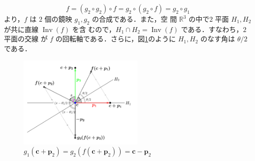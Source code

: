 \documentclass[11pt, uplatex, dvipdfmx, titlepage]{jsarticle}
\makeatletter
\DeclareMathOperator{\Inv}{Inv}
\renewenvironment{proof}[1][\proofname]{\par
  \pushQED{\qed}%
  \normalfont \topsep6\p@\@plus6\p@\relax
  \trivlist
  \item[\hskip\labelsep
         \bfseries
    {#1}]\ignorespaces
}{%
  \popQED\endtrivlist\@endpefalse
}
\theoremstyle{definition}
\renewcommand{\proofname}{\textbf{証明}}
\makeatother
\begin{document}
\begin{proof}
  \[
    f = (g_2 \circ g_2) \circ f = g_2 \circ (g_2 \circ f) = g_2 \circ g_1
  \]
  より，$f$ は $2$ 個の鏡映 $g_1, g_2$ の合成である．また，空
  間 $\mathbb{R}^3$ の中で$2$ 平面 $H_1, H_2$ が共に直線 $\Inv(f)$ を含
  むので，$H_1 \cap H_2 = \Inv(f)$ である．すなわち，$2$ 平面の交線
  が $f$ の回転軸である．さらに，図\ref{fig:cutplane3}のように $H_1,
  H_2$ のなす角は $\theta/2$ である．
  \begin{figure}[h]
    \centering
    \includegraphics[height=4.5cm]{pictures/cutplane3.pdf}
    \caption{$g_1(\bm{c}+\bm{p}_2) = g_2\left( f(\bm{c}+\bm{p}_2)\right) = \bm{c}-\bm{p}_2$}\label{fig:cutplane3}
  \end{figure}

 
  
  


  

\end{proof}
\end{document}
